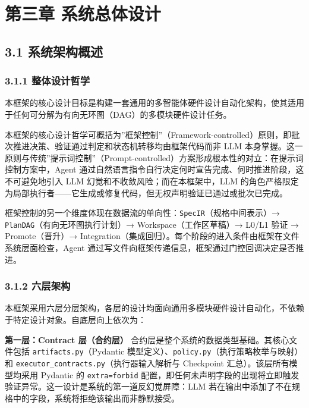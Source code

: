 \section{第三章
系统总体设计}\label{ux7b2cux4e09ux7ae0-ux7cfbux7edfux603bux4f53ux8bbeux8ba1}

\subsection{3.1
系统架构概述}\label{ux7cfbux7edfux67b6ux6784ux6982ux8ff0}

\subsubsection{3.1.1
整体设计哲学}\label{ux6574ux4f53ux8bbeux8ba1ux54f2ux5b66}

本框架的核心设计目标是构建一套通用的多智能体硬件设计自动化架构，使其适用于任何可分解为有向无环图（DAG）的多模块硬件设计任务。

本框架的核心设计哲学可概括为''框架控制''（Framework-controlled）原则，即批次推进决策、验证通过判定和状态机转移均由框架代码而非
LLM
本身掌握。这一原则与传统''提示词控制''（Prompt-controlled）方案形成根本性的对立：在提示词控制方案中，Agent
通过自然语言指令自行决定何时宣告完成、何时推进阶段，这不可避免地引入 LLM
幻觉和不收敛风险；而在本框架中，LLM
的角色严格限定为局部执行者------它生成或修复代码，但无权声明验证已通过或批次已完成。

框架控制的另一个维度体现在数据流的单向性：\texttt{SpecIR}（规格中间表示）→
\texttt{PlanDAG}（有向无环图执行计划）→ Workspace（工作区草稿）→ L0/L1
验证 → Promote（晋升）→
Integration（集成回归）。每个阶段的进入条件由框架在文件系统层面检查，Agent
通过写文件向框架传递信息，框架通过门控回调决定是否推进。

\subsubsection{3.1.2 六层架构}\label{ux516dux5c42ux67b6ux6784}

本框架采用六层分层架构，各层的设计均面向通用多模块硬件设计自动化，不依赖于特定设计对象。自底层向上依次为：

\textbf{第一层：Contract 层（合约层）}
合约层是整个系统的数据类型基础。其核心文件包括
\texttt{artifacts.py}（Pydantic
模型定义）、\texttt{policy.py}（执行策略枚举与映射）和
\texttt{executor\_contracts.py}（执行器输入解析与 Checkpoint
汇总）。该层所有模型均采用 Pydantic 的
\texttt{extra=\textquotesingle{}forbid\textquotesingle{}}
配置，即任何未声明字段的出现将立即触发验证异常。这一设计是系统的第一道反幻觉屏障：LLM
若在输出中添加了不在规格中的字段，系统将拒绝该输出而非静默接受。

